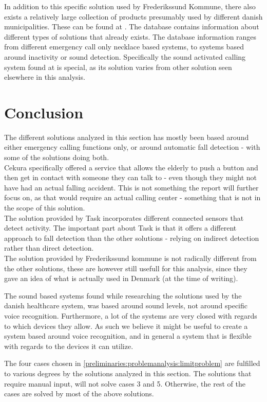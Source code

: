 In addition to this specific solution used by Frederikssund Kommune, there also exists a relatively large collection of products presumably used by different danish municipalities.
These can be found at \cite{hmi}. The database contains information about different types of solutions that already exists. The database information ranges from different emergency call only necklace based systems, to systems based around inactivity or sound detection. Specifically the sound activated calling system found at \cite{hmilak} is special, as its solution varies from other solution seen elsewhere in this analysis.

\section{Conclusion}
The different solutions analyzed in this section has mostly been based around either emergency calling functions only, or around automatic fall detection - with some of the solutions doing both.\\
Cekura specifically offered a service that allows the elderly to push a button and then get in contact with someone they can talk to - even though they might not have had an actual falling accident. This is not something the report will further focus on, as that would require an actual calling center - something that is not in the scope of this solution.\\
The solution provided by Task incorporates different connected sensors that detect activity. The important part about Task is that it offers a different approach to fall detection than the other solutions - relying on indirect detection rather than direct detection.\\
The solution provided by Frederikssund kommune is not radically different from the other solutions, these are however still usefull for this analysis, since they gave an idea of what is actually used in Denmark (at the time of writing).

The sound based systems found while researching the solutions used by the danish healthcare system, was based around sound levels, not around specific voice recognition. Furthermore, a lot of the systems are very closed with regards to which devices they allow. As such we believe it might be useful to create a system based around voice recognition, and in general a system that is flexible with regards to the devices it can utilize.

The four cases chosen in \ref{preliminaries:problemanalysis:limitproblem} are fulfilled to various degrees by the solutions analyzed in this section. The solutions that require manual input, will not solve cases 3 and 5. Otherwise, the rest of the cases are solved by most of the above solutions.